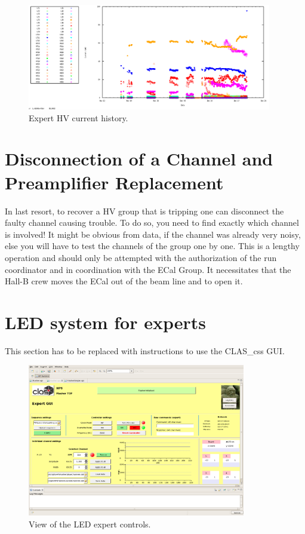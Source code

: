 \documentclass[12pt]{article}
\begin{document}
\begin{figure}[htbp]
\center
\includegraphics[width=0.95\textwidth]{pics/ECALHVCURRENTS_2014_12_20.png}
\caption{\small \label{HVhistory} Expert HV current history.}
\end{figure}

   \section{Disconnection of a Channel and Preamplifier Replacement}
     
      In last resort, to recover a HV group that is tripping one can disconnect the faulty channel causing trouble. To do so, you need to find exactly which channel is involved! It might be obvious from data, if the channel was already very noisy, else you will have to test the channels of the group one by one. This is a lengthy operation and should only be attempted with the authorization of the run coordinator and in coordination with the ECal Group. It necessitates that the Hall-B crew moves the ECal out of the beam line and to open it.

   \section{LED system for experts}

This section has to be replaced with instructions to use the CLAS\_css GUI.

\begin{figure}[htbp]
\center
\includegraphics[width=0.85\textwidth]{pics/LEDExpert_2014_12_20.png}
\caption{\small \label{LEDexpert} View of the LED expert controls.}
\end{figure}
\end{document}
